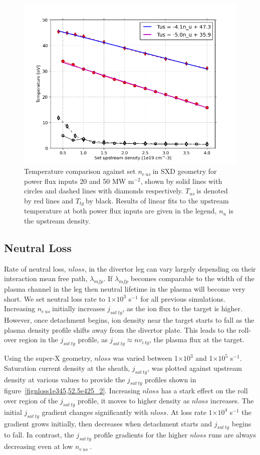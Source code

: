 \documentclass[12pt]{article}  %
\providecommand{\e}[1]{\ensuremath{\times 10^{#1}}} %
\providecommand{\pow}[1]{{$^{#1}$}} %
\providecommand{\neus}{$n_{e~us}~$} %
\providecommand{\Tus}{$T_{us}~$} %
\providecommand{\Ttg}{$T_{tg}~$} %
\begin{document}
\begin{figure}
\includegraphics[scale=0.5]{Figures/sol1d/SXDPFfit.png}
\centering
\caption{Temperature comparison against set \neus in SXD geometry for power flux inputs 20 and 50 MW m\pow{-2}, shown by solid lines with circles and dashed lines with diamonds respectively. \Tus is denoted by red lines and \Ttg by black. Results of linear fits to the upstream temperature at both power flux inputs are given in the legend, $n_u$ is the upstream density.}\label{figSXDPFfit}
\end{figure}


\subsection{Neutral Loss}\label{ssecNloss}
Rate of neutral loss, $nloss$, in the divertor leg can vary largely depending on their interaction mean free path, $\lambda_{mfp}$. If $\lambda_{mfp}$ becomes comparable to the width of the plasma channel in the leg then neutral lifetime in the plasma will become very short. We set neutral loss rate to $1\e{3}$ s\pow{-1} for all previous simulations. Increasing \neus initially increases $j_{sat~tg}$, as the ion flux to the target is higher. However, once detachment begins, ion density near the target starts to fall as the plasma density profile shifts away from the divertor plate. This leads to the roll-over region in the $j_{sat~tg}$ profile, as $j_{sat~tg} \approx nv_{i~tg}$, the plasma flux at the target.

Using the super-X geometry, $nloss$ was varied between 1\e{3} and 1\e{5} s\pow{-1}. Saturation current density at the sheath, $j_{sat~tg}$, was plotted against upstream density at various values to provide the $j_{sat~tg}$ profiles shown in figure~\ref{fignloss1e345,52.5e425_2}. Increasing $nloss$ has a stark effect on the roll over region of the $j_{sat~tg}$ profile, it moves to higher density as $nloss$ increases. The initial $j_{sat~tg}$ gradient changes significantly with $nloss$. At loss rate $1\e{4}$ s\pow{-1} the gradient grows initially, then decreases when detachment starts and $j_{sat~tg}$ begins to fall. In contrast, the $j_{sat~tg}$ profile gradients for the higher $nloss$ runs are always decreasing even at low \neus. 
\end{document}
